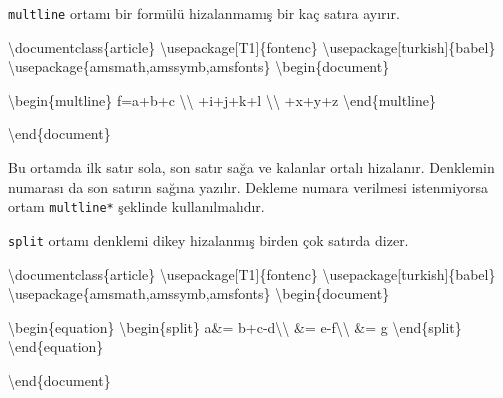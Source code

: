 \documentclass[
  letterpaper,
  DIV=11,
  numbers=noendperiod]{scrreprt}
\newenvironment{Shaded}{\begin{snugshade}}{\end{snugshade}}
\newcommand{\BuiltInTok}[1]{\textcolor[rgb]{0.00,0.23,0.31}{#1}}
\newcommand{\ExtensionTok}[1]{\textcolor[rgb]{0.00,0.23,0.31}{#1}}
\newcommand{\KeywordTok}[1]{\textcolor[rgb]{0.00,0.23,0.31}{#1}}
\newcommand{\NormalTok}[1]{\textcolor[rgb]{0.00,0.23,0.31}{#1}}
\newcommand{\SpecialCharTok}[1]{\textcolor[rgb]{0.37,0.37,0.37}{#1}}
\newcommand{\SpecialStringTok}[1]{\textcolor[rgb]{0.13,0.47,0.30}{#1}}
\begin{document}
\texttt{multline} ortamı bir formülü hizalanmamış bir kaç satıra ayırır.

\begin{Shaded}
\begin{Highlighting}[]
\BuiltInTok{\textbackslash{}documentclass}\NormalTok{\{}\ExtensionTok{article}\NormalTok{\}}
\BuiltInTok{\textbackslash{}usepackage}\NormalTok{[T1]\{}\ExtensionTok{fontenc}\NormalTok{\}}
\BuiltInTok{\textbackslash{}usepackage}\NormalTok{[turkish]\{}\ExtensionTok{babel}\NormalTok{\}}
\BuiltInTok{\textbackslash{}usepackage}\NormalTok{\{}\ExtensionTok{amsmath,amssymb,amsfonts}\NormalTok{\}}
\KeywordTok{\textbackslash{}begin}\NormalTok{\{}\ExtensionTok{document}\NormalTok{\}}

\KeywordTok{\textbackslash{}begin}\NormalTok{\{}\ExtensionTok{multline}\NormalTok{\}}
\SpecialStringTok{f=a+b+c }\SpecialCharTok{\textbackslash{}\textbackslash{}}
\SpecialStringTok{+i+j+k+l }\SpecialCharTok{\textbackslash{}\textbackslash{}}
\SpecialStringTok{+x+y+z}
\KeywordTok{\textbackslash{}end}\NormalTok{\{}\ExtensionTok{multline}\NormalTok{\}}

\KeywordTok{\textbackslash{}end}\NormalTok{\{}\ExtensionTok{document}\NormalTok{\}}
\end{Highlighting}
\end{Shaded}

Bu ortamda ilk satır sola, son satır sağa ve kalanlar ortalı hizalanır.
Denklemin numarası da son satırın sağına yazılır. Dekleme numara
verilmesi istenmiyorsa ortam \texttt{multline*} şeklinde
kullanılmalıdır.

\texttt{split} ortamı denklemi dikey hizalanmış birden çok satırda
dizer.

\begin{Shaded}
\begin{Highlighting}[]
\BuiltInTok{\textbackslash{}documentclass}\NormalTok{\{}\ExtensionTok{article}\NormalTok{\}}
\BuiltInTok{\textbackslash{}usepackage}\NormalTok{[T1]\{}\ExtensionTok{fontenc}\NormalTok{\}}
\BuiltInTok{\textbackslash{}usepackage}\NormalTok{[turkish]\{}\ExtensionTok{babel}\NormalTok{\}}
\BuiltInTok{\textbackslash{}usepackage}\NormalTok{\{}\ExtensionTok{amsmath,amssymb,amsfonts}\NormalTok{\}}
\KeywordTok{\textbackslash{}begin}\NormalTok{\{}\ExtensionTok{document}\NormalTok{\}}

\KeywordTok{\textbackslash{}begin}\NormalTok{\{}\ExtensionTok{equation}\NormalTok{\}}
\KeywordTok{\textbackslash{}begin}\NormalTok{\{}\ExtensionTok{split}\NormalTok{\}}
\SpecialStringTok{ a\&= b+c{-}d}\SpecialCharTok{\textbackslash{}\textbackslash{}}
\SpecialStringTok{  \&= e{-}f}\SpecialCharTok{\textbackslash{}\textbackslash{}}
\SpecialStringTok{  \&= g}
\KeywordTok{\textbackslash{}end}\NormalTok{\{}\ExtensionTok{split}\NormalTok{\}}
\KeywordTok{\textbackslash{}end}\NormalTok{\{}\ExtensionTok{equation}\NormalTok{\}}

\KeywordTok{\textbackslash{}end}\NormalTok{\{}\ExtensionTok{document}\NormalTok{\}}
\end{Highlighting}
\end{Shaded}
\end{document}
